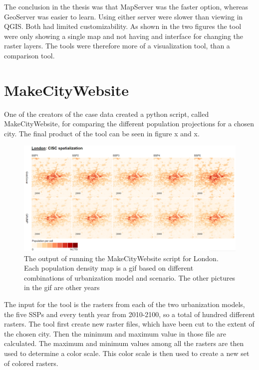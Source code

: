 The conclusion in the thesis was that MapServer was the faster option, whereas GeoServer was easier to learn. Using either server were slower than viewing in QGIS. Both had limited customizability. As shown in the two figures the tool were only showing a single map and not having and interface for changing the raster layers. The tools were therefore more of a visualization tool, than a comparison tool.



\section{MakeCityWebsite}
One of the creators of the case data created a python script, called MakeCityWebsite, for comparing the different population projections for a chosen city.  The final product of the tool can be seen in figure x and x. 

\begin{figure} [H]
	\centering
	\includegraphics[width=.8\textwidth]{Pictures/MakeCityWebsite1}
	\caption{The output of running the MakeCityWebsite script for London. Each population density map is a gif based on different combinations of urbanization model and scenario. The other pictures in the gif are other years}
	\label{MakeCityWebsite1}
\end{figure}

The input for the tool is the rasters from each of the two urbanization models, the five SSPs and every tenth year from 2010-2100, so a total of hundred different rasters.
The tool first create new raster files, which have been cut to the extent of the chosen city. Then the minimum and maximum value in those file are calculated. The maximum and minimum values among all the rasters are then used to determine a color scale. This color scale is then used to create a new set of colored rasters.

